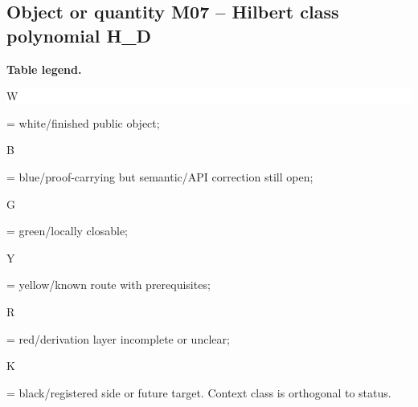 \subsection*{Object or quantity M07 -- Hilbert class polynomial H\_D}
\hypertarget{objproof:M07}{}
\par\smallskip\noindent\begin{minipage}{0.99\linewidth}\footnotesize\raggedright\textbf{Table legend.} \colorbox{white}{\strut W} = white/finished public object; \colorbox{cyan!20}{\strut B} = blue/proof-carrying but semantic/API correction still open; \colorbox{green!18}{\strut G} = green/locally closable; \colorbox{yellow!25}{\strut Y} = yellow/known route with prerequisites; \colorbox{red!20}{\strut R} = red/derivation layer incomplete or unclear; \colorbox{black!18}{\strut K} = black/registered side or future target. Context class is orthogonal to status.\end{minipage}\par\vspace{0.25em}
